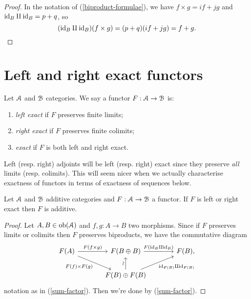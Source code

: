 \begin{proof}
  In the notation of (\ref{biproduct-formulae}), we have $f \times g =
  if + jg$ and $\mathrm{id}_B \amalg \mathrm{id}_B = p + q$, so
  \[
  (\mathrm{id}_B \amalg \mathrm{id}_B)(f \times g) = (p+q)(if+jg) = f+g. \qedhere
  \]
\end{proof}




\section{Left and right exact functors}

\begin{definition}
  \label{exactness}
  Let $\mathcal{A}$ and $\mathcal{B}$ categories. We say a functor $F : \mathcal{A} \to \mathcal{B}$ is:
  \begin{enumerate}
  \item \emph{left exact} if $F$ preserves finite limits;
  \item \emph{right exact} if $F$ preserves finite colimits;
  \item \emph{exact} if $F$ is both left and right exact.
  \end{enumerate}
\end{definition}

\begin{example}
  Left (resp. right) adjoints will be left (resp. right) exact since
  they preserve \emph{all} limits (resp. colimits). This will seem
  nicer when we actually characterise exactness of functors in terms
  of exactness of sequences below.
\end{example}

\begin{lemma}
  \label{exact-additive}
  Let $\mathcal{A}$ and $\mathcal{B}$ additive categories and $F : \mathcal{A} \to \mathcal{B}$ a
  functor. If $F$ is left or right exact then $F$ is additive.
\end{lemma}

\begin{proof}
  Let $A,B \in \operatorname{ob}(\mathcal{A})$ and $f,g : A \to B$ two morphisms. Since if
  $F$ preserves limits or colimits then $F$ preserves biproducts, we
  have the commutative diagram
  \[
  \begin{tikzcd}[column sep = large]
    F(A) \rar{F(f \times g)} \ar{dr}[swap]{F(f) \times F(g)} & F(B
    \oplus B) \rar{F(\id_B \amalg \id_B)} & F(B), \\ & F(B) \oplus
    F(B) \ar{u}[anchor=center,rotate=90,yshift=3pt]{\sim}
    \ar{ur}[swap]{\id_{F(B)} \amalg \id_{F(B)}} &
  \end{tikzcd}
  \]
  notation as in (\ref{sum-factor}). Then we're done by
  (\ref{sum-factor}).
\end{proof}

